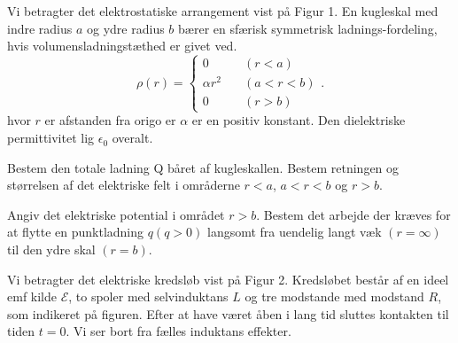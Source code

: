 
\title{\vspace{-1cm}\vspace{-1cm}}
\author{}
\date{}


\pagecolor{color1}
\maketitle
\thispagestyle{fancy}
\begin{exercise}[Opgave 1]
Vi betragter det elektrostatiske arrangement vist på Figur 1. En kugleskal
med indre radius $a$ og ydre radius $b$ bærer en sfærisk symmetrisk ladnings-fordeling, hvis volumensladningstæthed er givet ved.
\[
\rho\left( r \right) = \begin{cases}
	0 \quad &\left( r<a \right) \\
	\alpha r^2 \quad &\left( a<r<b \right) \\
	0 \quad &\left( r > b \right) 
\end{cases}
.\]
hvor $r$ er afstanden fra origo er $\alpha $ er en positiv konstant. Den dielektriske permittivitet lig $\epsilon_0$ overalt.
\end{exercise}
\begin{figure}[ht]
    \centering
    \label{fig:opgave1}
\end{figure}
\begin{subexercise}[a]
Bestem den totale ladning Q båret af kugleskallen. Bestem retningen og størrelsen af det elektriske felt i områderne $r<a$,  $a<r<b$ og $r>b$.
\end{subexercise}
\begin{solution}

\end{solution}
\begin{subexercise}[b]
Angiv det elektriske potential i området $r>b$.
Bestem det arbejde der kræves for at flytte en punktladning $q\left( q>0 \right) $
langsomt fra uendelig langt væk $\left( r = \infty \right) $ til den ydre skal $\left( r=b \right) $.
\end{subexercise}
\begin{solution}

\end{solution}
\begin{exercise}[Opgave 2]
Vi betragter det elektriske kredsløb vist på Figur 2. Kredsløbet består af
en ideel emf kilde $\mathcal{E} $, to spoler med selvinduktans $L$ og tre modstande med
modstand $R$, som indikeret på figuren. Efter at have været åben i lang tid
sluttes kontakten til tiden $t=0$. Vi ser bort fra fælles induktans effekter.
\end{exercise}

